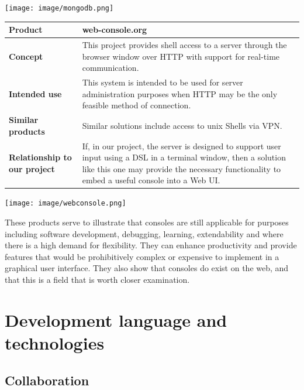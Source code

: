 \begin{center}
\texttt{[image: image/mongodb.png]}
\label{mongodbcimage}%
\end{center}


\begin{center}
\begin{tabularx}{\textwidth}{ l X }
\hline
\textbf{Product} & web-console.org \\ \hline
\textbf{Concept} & This project provides shell access to a server through the browser window over HTTP with support for real-time communication. \\ \hline
\textbf{Intended use} & This system is intended to be used for server administration purposes when HTTP may be the only feasible method of connection. \\ \hline
\textbf{Similar products} & Similar solutions include access to unix Shells via VPN. \\ \hline
\textbf{Relationship to our project} & If, in our project, the server is designed to support user input using a DSL in a terminal window, then a solution like this one may provide the necessary functionality to embed a useful console into a Web UI. \\ \hline
\end{tabularx}
\label{tab:webconsolec}
\end{center}

\begin{center}
\texttt{[image: image/webconsole.png]}
\label{webconsolecimage}%
\end{center}

These products serve to illustrate that consoles are still applicable for purposes including software development, debugging, learning, extendability and where there is a high demand for flexibility. They can enhance productivity and provide features that would be prohibitively complex or expensive to implement in a graphical user interface. They also show that consoles do exist on the web, and that this is a field that is worth closer examination.


\section{Development language and technologies}
\subsection{Collaboration}

